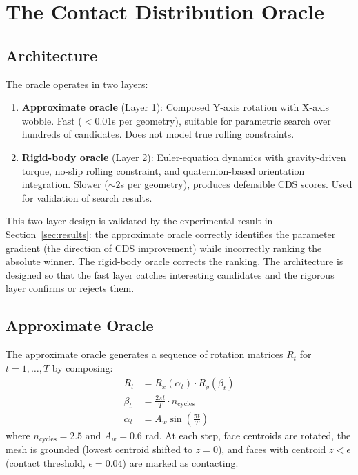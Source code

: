 \documentclass[11pt,a4paper]{article}
\begin{document}

\section{The Contact Distribution Oracle}

\subsection{Architecture}

The oracle operates in two layers:

\begin{enumerate}[leftmargin=*]
  \item \textbf{Approximate oracle} (Layer 1): Composed Y-axis rotation
    with X-axis wobble. Fast ($< 0.01$s per geometry), suitable for
    parametric search over hundreds of candidates. Does not model true
    rolling constraints.
  \item \textbf{Rigid-body oracle} (Layer 2): Euler-equation dynamics
    with gravity-driven torque, no-slip rolling constraint, and
    quaternion-based orientation integration. Slower ($\sim 2$s per
    geometry), produces defensible CDS scores. Used for validation of
    search results.
\end{enumerate}

This two-layer design is validated by the experimental result in
Section~\ref{sec:results}: the approximate oracle correctly identifies
the parameter gradient (the direction of CDS improvement) while
incorrectly ranking the absolute winner. The rigid-body oracle
corrects the ranking. The architecture is designed so that the fast
layer catches interesting candidates and the rigorous layer confirms
or rejects them.

\subsection{Approximate Oracle}

The approximate oracle generates a sequence of rotation matrices
$R_t$ for $t = 1, \ldots, T$ by composing:
\begin{align}
  R_t &= R_x(\alpha_t) \cdot R_y(\beta_t) \\
  \beta_t &= \frac{2\pi t}{T} \cdot n_{\mathrm{cycles}} \\
  \alpha_t &= A_w \sin\!\left(\frac{\pi t}{T}\right)
\end{align}
where $n_{\mathrm{cycles}} = 2.5$ and $A_w = 0.6$ rad. At each step,
face centroids are rotated, the mesh is grounded (lowest centroid
shifted to $z = 0$), and faces with centroid $z < \epsilon$ (contact
threshold, $\epsilon = 0.04$) are marked as contacting.
\end{document}
